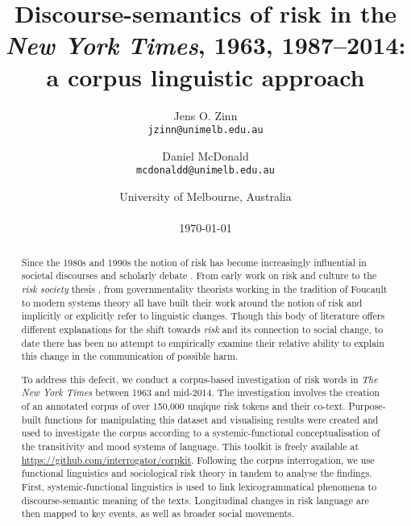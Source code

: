 \documentclass{report}
\title{Discourse-semantics of risk in the \emph{New York Times}, 1963, 1987--2014: \\ a corpus linguistic approach}
\author{
    Jens O. Zinn\\
    \texttt{jzinn@unimelb.edu.au}
    \and
    Daniel McDonald\\
    \texttt{mcdonaldd@unimelb.edu.au}\\
    }
\date{University of Melbourne, Australia\\
    ~\\
    \today}
\begin{document}
        

    \renewcommand{\abstractname}{Abstract}

    \maketitle

\begin{abstract}

    Since the 1980s and 1990s the notion of risk has become increasingly influential in societal discourses and scholarly debate \cite{skolbekken_risk_1995}. From early work on risk and culture \cite{douglas_risk_1986,douglas_risk_2013} to the \emph{risk society} thesis \cite{beck_risk_1992,beck_world_2009,giddens_runaway_2002}, from governmentality theorists working in the tradition of Foucault \cite{dean_governmentality:_2010,omalley_risk_2012,rose_powers_1999} to modern systems theory \cite{luhmann_risk:_1993} all have built their work around the notion of risk and implicitly or explicitly refer to linguistic changes. Though this body of literature offers different explanations for the shift towards \emph{risk} and its connection to social change, to date there has been no attempt to empirically examine their relative ability to explain this change in the communication of possible harm. 


    To address this defecit, we conduct a corpus-based investigation of risk words in \emph{The New York Times} between 1963 and mid-2014. The investigation involves the creation of an annotated corpus of over 150,000 unqique risk tokens and their co-text. Purpose-built functions for manipulating this dataset and visualising results were created and used to investigate the corpus according to a systemic-functional conceptualisation of the transitivity and mood systems of language. This toolkit is freely available at \url{https://github.com/interrogator/corpkit}. Following the corpus interrogation, we use functional linguistics and sociological risk theory in tandem to analyse the findings. First, systemic-functional linguistics is used to link lexicogrammatical phenomena to discourse-semantic meaning of the texts. Longitudinal changes in risk language are then mapped to key events, as well as broader social movements.


\end{abstract}
\end{document}

